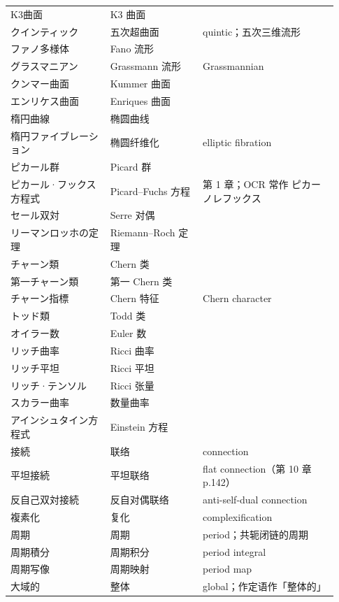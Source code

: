 \begin{longtable}{@{}>{\raggedright\arraybackslash}p{0.29\linewidth}>{\raggedright\arraybackslash}p{0.26\linewidth}>{\raggedright\arraybackslash}p{0.38\linewidth}@{}}
K3曲面 & K3 \mbox{曲面} &  \\
クインティック & \mbox{五次超曲面} & quintic；五次三维流形 \\
ファノ多様体 & Fano \mbox{流形} &  \\
グラスマニアン & Grassmann \mbox{流形} & Grassmannian \\
クンマー曲面 & Kummer \mbox{曲面} &  \\
エンリケス曲面 & Enriques \mbox{曲面} &  \\
楕円曲線 & \mbox{椭圆曲线} &  \\
楕円ファイブレーション & \mbox{椭圆纤维化} & elliptic fibration \\
ピカール群 & Picard \mbox{群} &  \\
ピカール·フックス方程式 & Picard--Fuchs \mbox{方程} & 第 1 章；OCR 常作 ピカーノレフックス \\
セール双対 & Serre \mbox{对偶} &  \\
リーマン\textendash{}ロッホの定理 & Riemann--Roch \mbox{定理} &  \\
チャーン類 & Chern \mbox{类} &  \\
第一チャーン類 & \mbox{第一} Chern \mbox{类} &  \\
チャーン指標 & Chern \mbox{特征} & Chern character \\
トッド類 & Todd \mbox{类} &  \\
オイラー数 & Euler \mbox{数} &  \\
リッチ曲率 & Ricci \mbox{曲率} &  \\
リッチ平坦 & Ricci \mbox{平坦} &  \\
リッチ·テンソル & Ricci \mbox{张量} &  \\
スカラー曲率 & \mbox{数量曲率} &  \\
アインシュタイン方程式 & Einstein \mbox{方程} &  \\
接続 & \mbox{联络} & connection \\
平坦接続 & \mbox{平坦联络} & flat connection（第 10 章 p.142） \\
反自己双対接続 & \mbox{反自对偶联络} & anti-self-dual connection \\
複素化 & \mbox{复化} & complexification \\
周期 & \mbox{周期} & period；共轭闭链的周期 \\
周期積分 & \mbox{周期积分} & period integral \\
周期写像 & \mbox{周期映射} & period map \\
大域的 & \mbox{整体} & global；作定语作「整体的」 \\

\end{longtable}
